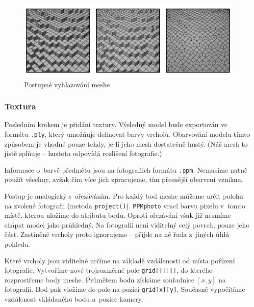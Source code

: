 \documentclass[12pt]{report}			%
\begin{document}
                        \begin{figure}[h]
                            \centering
                            \includegraphics[width=\textwidth]{images/smoothMesh.pdf}
                            \caption{Postupné vyhlazování meshe}
                        \end{figure}

                   \subsubsection{Textura}
    
                        Posledním krokem je přidání textury. Výsledný model bude exportován ve formátu \verb|.ply|, který umožňuje definovat barvy vrcholů. Obarvování modelu tímto způsobem je vhodné pouze tehdy, je-li jeho mesh dostatečně hustý. (Náš mesh to jistě splňuje -- hustota odpovídá rozlišení fotografie.)
    
                        Informace o~barvě předmětu jsou na fotografiích formátu \verb|.ppm|. Nemusíme nutně použít všechny, avšak čím více jich zpracujeme, tím přesnější obarvení vznikne.
    
                        Postup je analogický s~ořezáváním. Pro každý bod meshe můžeme určit polohu na zvolené fotografii (metoda \verb|project()|). \verb|PPMphoto| vrací barvu pixelu v~tomto místě, kterou uložíme do atributu bodu. Oproti ořezávání však již nesmíme chápat model jako průhledný. Na fotografii není viditelný celý povrch, pouze jeho část. Zastíněné vrcholy proto  ignorujeme -- přijde na ně řada z~jiných úhlů pohledu.
    
                        Které vrcholy jsou viditelné určíme na základě vzdálenosti od místa pořízení fotografie. Vytvoříme nové trojrozměrné pole \verb|grid[][][]|, do kterého rozprostřeme body meshe. Průmětem bodu získáme souřadnice $[x,y]$ na fotografii. Bod pak vložíme do pole na pozici \verb|grid[x][y]|. Současně vypočítáme vzdálenost vkládaného bodu a~pozice kamery.
    
\end{document}
